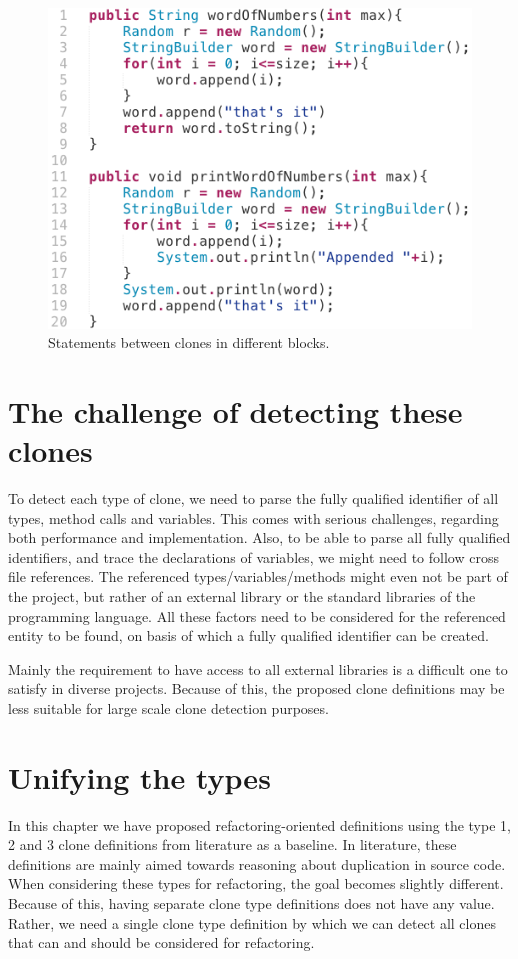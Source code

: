 \begin{figure}[H]
  \centering
  \includegraphics[width=0.6\columnwidth]{img/type3invalid}
  \caption{Statements between clones in different blocks.}
  \label{fig:type3invalid}
\end{figure}

\section{The challenge of detecting these clones}\label{chap:challenge}
To detect each type of clone, we need to parse the fully qualified identifier of all types, method calls and variables. This comes with serious challenges, regarding both performance and implementation. Also, to be able to parse all fully qualified identifiers, and trace the declarations of variables, we might need to follow cross file references. The referenced types/variables/methods might even not be part of the project, but rather of an external library or the standard libraries of the programming language. All these factors need to be considered for the referenced entity to be found, on basis of which a fully qualified identifier can be created.

Mainly the requirement to have access to all external libraries is a difficult one to satisfy in diverse projects. Because of this, the proposed clone definitions may be less suitable for large scale clone detection purposes.

\section{Unifying the types}\label{sec:unifying}
In this chapter we have proposed refactoring-oriented definitions using the type 1, 2 and 3 clone definitions from literature as a baseline. In literature, these definitions are mainly aimed towards reasoning about duplication in source code. When considering these types for refactoring, the goal becomes slightly different. Because of this, having separate clone type definitions does not have any value. Rather, we need a single clone type definition by which we can detect all clones that can and should be considered for refactoring.

